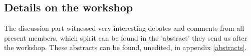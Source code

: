 \subsection{Details on the workshop}

The discussion part witnessed very interesting debates and comments from all present members, which spirit can be found in the 'abstract' they send us after the workshop. These abstracts can be found, unedited, in appendix \ref{abstracts}.








